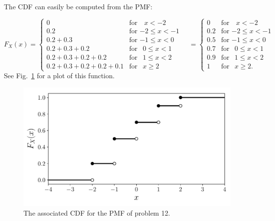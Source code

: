 \begin{problem}{12} The CDF can easily be computed from the PMF:




\begin{equation*}  
  F_X(x) = \begin{cases}
                                   0 & \text{for $~~~x<-2$} \\
                                   0.2 & \text{for  $-2 \le x <-1$} \\
                                   0.2+0.3 & \text{for $-1 \le x <0$} \\
                                   0.2+0.3+0.2 & \text{for $~~0 \le x <1$} \\
                                   0.2+0.3+0.2+0.2 & \text{for  $~~1 \le x <2$} \\
                                   0.2+0.3+0.2+0.2+0.1 & \text{for  $~~x \ge 2$}
       \end{cases} \quad
= \begin{cases}
                                   0 & \text{for $~~~x<-2$} \\
                                   0.2 & \text{for  $-2 \le x <-1$} \\
                                   0.5 & \text{for $-1 \le x <0$} \\
                                   0.7 & \text{for $~~0 \le x <1$} \\
                                   0.9& \text{for  $~~1 \le x <2$} \\
                                   1 & \text{for  $~~x \ge 2$}.
       \end{cases}
\end{equation*}
See Fig.~\ref{fig:prob_12} for a plot of this function.


	\begin{figure}[t]
	\centering
      		 \includegraphics[totalheight=6cm]{chpt3/prob12.pdf}
  			  \caption{The associated CDF for the PMF of problem 12.}
    			   \label{fig:prob_12}
	\end{figure}

\end{problem}

